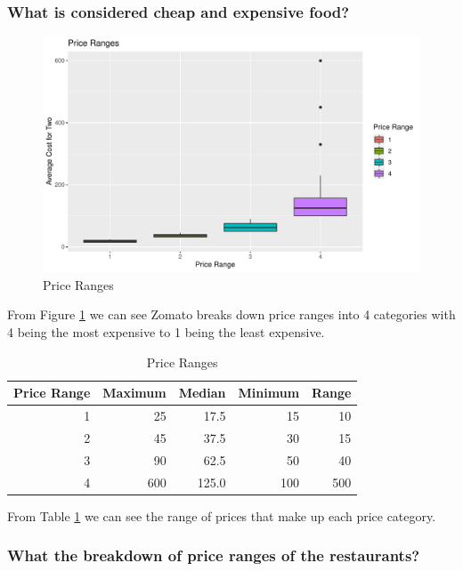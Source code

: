 \documentclass[11pt,a4paper,]{article}
\begin{document}
\hypertarget{what-is-considered-cheap-and-expensive-food}{%
\subsubsection{What is considered cheap and expensive food?}\label{what-is-considered-cheap-and-expensive-food}}

\begin{figure}
\centering
\includegraphics{assignment4_files/figure-latex/price-ranges-1.pdf}
\caption{\label{fig:price-ranges}Price Ranges}
\end{figure}

From Figure \ref{fig:price-ranges} we can see Zomato breaks down price ranges into 4 categories with 4 being the most expensive to 1 being the least expensive.

\begin{table}[!h]

\caption{\label{tab:price-range-table}Price Ranges}
\centering
\begin{tabular}[t]{r|r|r|r|r}
\hline
Price Range & Maximum & Median & Minimum & Range\\
\hline
1 & 25 & 17.5 & 15 & 10\\
\hline
2 & 45 & 37.5 & 30 & 15\\
\hline
3 & 90 & 62.5 & 50 & 40\\
\hline
4 & 600 & 125.0 & 100 & 500\\
\hline
\end{tabular}
\end{table}

From Table \ref{tab:price-range-table} we can see the range of prices that make up each price category.

\hypertarget{what-the-breakdown-of-price-ranges-of-the-restaurants}{%
\subsubsection{What the breakdown of price ranges of the restaurants?}\label{what-the-breakdown-of-price-ranges-of-the-restaurants}}
\end{document}
